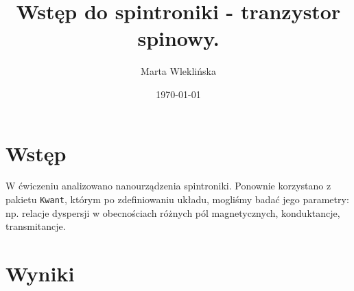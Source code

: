 \documentclass{article}
\title{Wstęp do spintroniki - tranzystor spinowy.}
\author{Marta Wleklińska}
\date{\today}
\begin{document}
\maketitle

\section{Wstęp}
W ćwiczeniu analizowano nanourządzenia spintroniki.
Ponownie korzystano z pakietu \texttt{Kwant}, którym po zdefiniowaniu układu, mogliśmy badać jego parametry: np. relacje dyspersji w obecnościach różnych pól magnetycznych, konduktancje, transmitancje.

\section{Wyniki}
\end{document}
